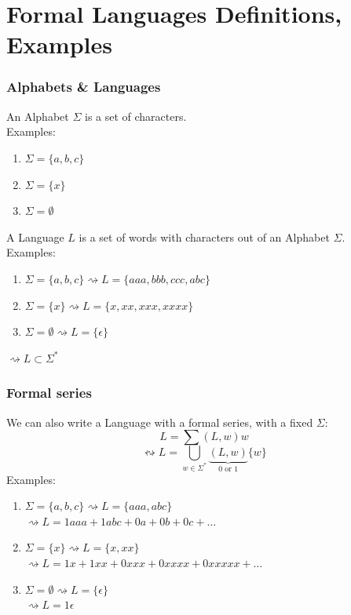 \documentclass{beamer}
\begin{document}
\frame{\titlepage}
\section{Formal Languages Definitions, Examples}
\begin{frame}
  \frametitle{Alphabets \& Languages}
  An Alphabet $\Sigma$ is a set of characters.\\
  Examples:
  \begin{enumerate}
    \item $\Sigma = \{a,b,c\}$
    \item $\Sigma = \{x\}$
    \item $\Sigma = \emptyset$
  \end{enumerate}
  A Language $L$ is a set of words with characters 
  out of an Alphabet $\Sigma$.\\
  Examples:
  \begin{enumerate}
    \item $\Sigma = \{a,b,c\} \rightsquigarrow L = \{aaa, bbb, ccc, abc\}$
    \item $\Sigma = \{x\} \rightsquigarrow L = \{ x, xx, xxx, xxxx\}$
    \item $\Sigma = \emptyset \rightsquigarrow L = \{\epsilon \}$
  \end{enumerate}
  $\rightsquigarrow L \subset \Sigma^*$
\end{frame}

\begin{frame}
  \frametitle{Formal series}
  We can also write a Language with a formal series, with a fixed $\Sigma$:
    \[ L = \sum (L,w)w\]
    \[ 
      \leftrightsquigarrow  L = 
      \bigcup_{w \in \Sigma^{*}}
      \underbrace{(L,w)}_\text{0 or 1}
      \{w\} 
    \]
  Examples:
  \begin{enumerate}
    \item $\Sigma = \{a,b,c\} \rightsquigarrow L = \{aaa, abc\}$ \\
          $\rightsquigarrow L = 1aaa + 1abc + 0a + 0b + 0c + \dots$
    \item $\Sigma = \{x\} \rightsquigarrow L = \{ x, xx\}$ \\
            $\rightsquigarrow L = 1x + 1xx + 0xxx + 0xxxx +  0xxxxx + \dots$
          \item $\Sigma = \emptyset \rightsquigarrow L = \{ \epsilon \}$ \\
            $\rightsquigarrow L = 1\epsilon$
  \end{enumerate}
\end{frame}
\end{document}
